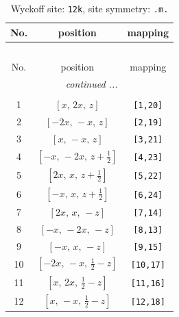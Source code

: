 \documentclass[fleqn,8pt]{jsarticle}
\begin{document}
\begin{longtable}{ccc}
\caption{Wyckoff site: {\tt 12k}, site symmetry: {\tt .m.}}
 \\
 \hline \hline
No. & position & mapping \\ \hline \endfirsthead

\multicolumn{2}{l}{\tablename\ \thetable{}} \\
 \hline \hline
No. & position & mapping \\ \hline \endhead

 \hline \hline
\multicolumn{2}{r}{\footnotesize\it continued ...} \\ \endfoot

 \hline \hline
\multicolumn{2}{r}{} \\ \endlastfoot

1 & $\left[ x,\, 2 x,\, z \right]$ & {\tt [1,20]} \\ \hline
2 & $\left[ - 2 x,\, - x,\, z \right]$ & {\tt [2,19]} \\ \hline
3 & $\left[ x,\, - x,\, z \right]$ & {\tt [3,21]} \\ \hline
4 & $\left[ - x,\, - 2 x,\, z + \frac{1}{2} \right]$ & {\tt [4,23]} \\ \hline
5 & $\left[ 2 x,\, x,\, z + \frac{1}{2} \right]$ & {\tt [5,22]} \\ \hline
6 & $\left[ - x,\, x,\, z + \frac{1}{2} \right]$ & {\tt [6,24]} \\ \hline
7 & $\left[ 2 x,\, x,\, - z \right]$ & {\tt [7,14]} \\ \hline
8 & $\left[ - x,\, - 2 x,\, - z \right]$ & {\tt [8,13]} \\ \hline
9 & $\left[ - x,\, x,\, - z \right]$ & {\tt [9,15]} \\ \hline
10 & $\left[ - 2 x,\, - x,\, \frac{1}{2} - z \right]$ & {\tt [10,17]} \\ \hline
11 & $\left[ x,\, 2 x,\, \frac{1}{2} - z \right]$ & {\tt [11,16]} \\ \hline
12 & $\left[ x,\, - x,\, \frac{1}{2} - z \right]$ & {\tt [12,18]} \\
\end{longtable}
\renewcommand{\arraystretch}{1.2}
\end{document}
